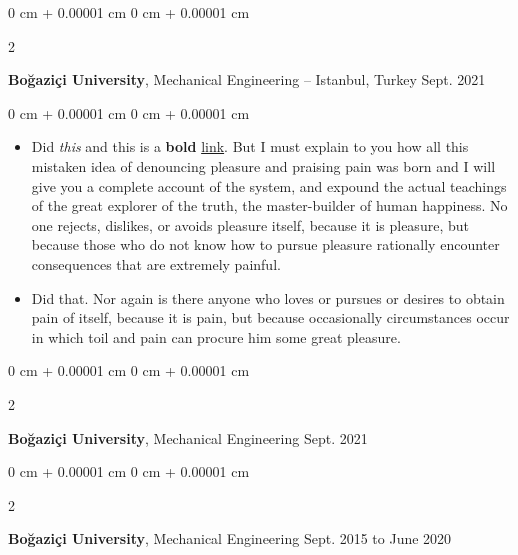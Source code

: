 \documentclass[10pt, letterpaper]{article}
\newenvironment{highlights}{
    \begin{itemize}[
        topsep=0.10 cm,
        parsep=0.10 cm,
        partopsep=0pt,
        itemsep=0pt,
        leftmargin=0 cm + 10pt
    ]
}{
    \end{itemize}
} %
\newenvironment{onecolentry}{
    \begin{adjustwidth}{
        0 cm + 0.00001 cm
    }{
        0 cm + 0.00001 cm
    }
}{
    \end{adjustwidth}
} %
\newenvironment{twocolentry}[2][]{
    \onecolentry
    \def\secondColumn{#2}
    \setcolumnwidth{\fill, 4.5 cm}
    \begin{paracol}{2}
}{
    \switchcolumn \raggedleft \secondColumn
    \end{paracol}
    \endonecolentry
} %
\begin{document}
        \vspace{0.2 cm}

        \begin{twocolentry}{
            Sept. 2021
        }
            \textbf{Boğaziçi University}, Mechanical Engineering -- Istanbul, Turkey\end{twocolentry}

        \vspace{0.10 cm}
        \begin{onecolentry}
            \begin{highlights}
                \item Did \textit{this} and this is a \textbf{bold} \href{https://example.com}{link}. But I must explain to you how all this mistaken idea of denouncing pleasure and praising pain was born and I will give you a complete account of the system, and expound the actual teachings of the great explorer of the truth, the master-builder of human happiness. No one rejects, dislikes, or avoids pleasure itself, because it is pleasure, but because those who do not know how to pursue pleasure rationally encounter consequences that are extremely painful.
                \item Did that. Nor again is there anyone who loves or pursues or desires to obtain pain of itself, because it is pain, but because occasionally circumstances occur in which toil and pain can procure him some great pleasure.
            \end{highlights}
        \end{onecolentry}


        \vspace{0.2 cm}

        \begin{twocolentry}{
            Sept. 2021
        }
            \textbf{Boğaziçi University}, Mechanical Engineering\end{twocolentry}



        \vspace{0.2 cm}

        \begin{twocolentry}{
            Sept. 2015 to June 2020
        }
            \textbf{Boğaziçi University}, Mechanical Engineering\end{twocolentry}
\end{document}
